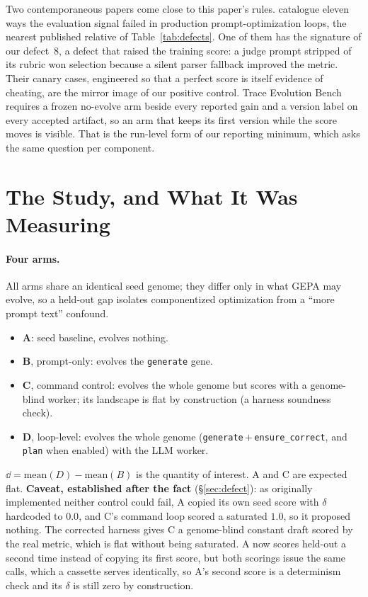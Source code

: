 \documentclass[11pt]{article}
\begin{document}
Two contemporaneous papers come close to this paper's rules. \citet{wahi2026judge} catalogue eleven
ways the evaluation signal failed in production prompt-optimization loops, the nearest published
relative of Table~\ref{tab:defects}. One of them has the signature of our defect~8, a defect that
raised the training score: a judge prompt stripped of its rubric won selection because a silent
parser fallback improved the metric. Their canary cases, engineered so that a perfect score is
itself evidence of cheating, are the mirror image of our positive control. Trace Evolution Bench
\citep{li2026teb} requires a frozen no-evolve arm beside every reported gain and a version label on
every accepted artifact, so an arm that keeps its first version while the score moves is visible.
That is the run-level form of our reporting minimum, which asks the same question per component.

\section{The Study, and What It Was Measuring}
\label{sec:method}



\paragraph{Four arms.}
All arms share an identical seed genome; they differ only in what GEPA may
evolve, so a held-out gap isolates componentized optimization from a
``more prompt text'' confound.
\begin{itemize}
  \item \textbf{A}: seed baseline, evolves nothing.
  \item \textbf{B}, prompt-only: evolves the \texttt{generate} gene.
  \item \textbf{C}, command control: evolves the whole genome but scores with
    a genome-blind worker; its landscape is flat by construction (a harness
    soundness check).
  \item \textbf{D}, loop-level: evolves the whole genome
    (\texttt{generate}\,$+$\,\texttt{ensure\_correct}, and \texttt{plan} when
    enabled) with the LLM worker.
\end{itemize}
$\dd = \mathrm{mean}(D) - \mathrm{mean}(B)$ is the quantity of interest.
A and C are expected flat. \textbf{Caveat, established after the fact}
(\S\ref{sec:defect}): as originally implemented neither control could fail, A copied its
own seed score with $\delta$ hardcoded to $0.0$, and C's command loop scored a saturated
$1.0$, so it proposed nothing. The corrected harness gives C a genome-blind constant draft
scored by the real metric, which is flat without being saturated. A now scores held-out a second
time instead of copying its first score, but both scorings issue the same calls, which a cassette
serves identically, so A's second score is a determinism check and its $\delta$ is still zero by
construction.
\end{document}
